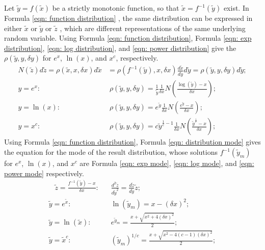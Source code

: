 \documentclass[twoside]{article}
\numberwithin{equation}{section}
\newcommand{\eqspace}{\;\;\;}
\begin{document}
Let $\tilde{y} = f(\tilde{x})$ be a strictly monotonic function, so that $\tilde{x} = f^{-1}(\tilde{y})$ exist.
In Formula \eqref{eqn: function distribution} \cite{Statistical_Methods}, the same distribution can be expressed in either $\tilde{x}$ or $\tilde{y}$ or $\tilde{z}$ , which are different representations of the same underlying random variable.
Using Formula \eqref{eqn: function distribution}, Formula \eqref{eqn: exp distribution}, \eqref{eqn: log distribution}, and \eqref{eqn: power distribution} give the $\rho(\tilde{y}, y, \delta y)$ for $e^x$, $\ln(x)$, and $x^c$, respectively.
\begin{align}
\label{eqn: function distribution}
N(\tilde{z}) d \tilde{z} = \rho(\tilde{x}, x, \delta x) d\tilde{x} &= \rho(f^{-1}(\tilde{y}), x, \delta x) \frac{d\tilde{x}}{d\tilde{y}} d\tilde{y} 
= \rho(\tilde{y}, y, \delta y) d\tilde{y}; \\
\label{eqn: exp distribution}
y = e^x: &\; \rho(\tilde{y}, y, \delta y) = \frac{1}{\tilde{y}} \frac{1}{\delta x} N(\frac{\log(\tilde{y}) - x}{\delta x}); \\
\label{eqn: log distribution}
y = \ln(x): &\; \rho(\tilde{y}, y, \delta y) = e^{\tilde{y}} \frac{1}{\delta x} N(\frac{e^{\tilde{y}} - x}{\delta x}); \\
\label{eqn: power distribution}
y = x^c: &\; \rho(\tilde{y}, y, \delta y) = c \tilde{y}^{\frac{1}{c}-1} \frac{1}{\delta x} N(\frac{\tilde{y}^\frac{1}{c} - x}{\delta x}); 
\end{align}
Using Formula \eqref{eqn: function distribution}, Formula \eqref{eqn: distribution mode} gives the equation for the mode of the result distribution, whose solutions $f^{-1}(\tilde{y}_m)$ for $e^x$, $\ln(x)$, and $x^c$ are Formula \eqref{eqn: exp mode}, \eqref{eqn: log mode}, and \eqref{eqn: power mode} respectively.
\begin{align}
\label{eqn: distribution mode}
\eqspace \tilde{z} = \frac{f^{-1}(\tilde{y}) - x}{\delta x}: &\eqspace \frac{d^2 \tilde{z}}{d \tilde{y}^2} = \frac{d \tilde{z}}{d \tilde{y}} \tilde{z}; \\
\label{eqn: exp mode}
\tilde{y} = e^{\tilde{x}}: &\eqspace \ln(\tilde{y}_m) = x - (\delta x)^2; \\
\label{eqn: log mode}
\tilde{y} = \ln(\tilde{x}): &\eqspace e^{\tilde{y}_m} = \frac{x + \sqrt{x^2 + 4 (\delta x)^2}}{2}; \\
\label{eqn: power mode}
\tilde{y} = \tilde{x}^c: &\eqspace (\tilde{y}_m)^{1/c} = \frac{x + \sqrt{x^2 - 4(c-1)(\delta x)^2}}{2};
\end{align}
\end{document}
